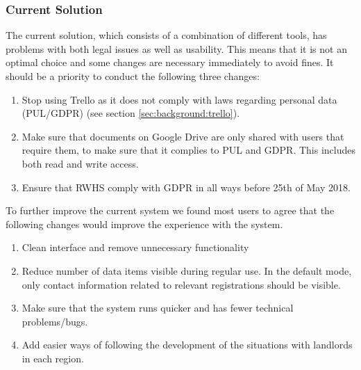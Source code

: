 \subsubsection{Current Solution}
\label{sec:result:current-solution}
The current solution, which consists of a combination of different tools, has problems with both legal issues as well as usability. This means that it is not an optimal choice and some changes are necessary immediately to avoid fines. It should be a priority to conduct the following three changes:
\begin{enumerate}
\item Stop using Trello as it does not comply with laws regarding personal data (PUL/GDPR) (see section \ref{sec:background:trello}).
\item Make sure that documents on Google Drive are only shared with users that require them, to make sure that it complies to PUL and GDPR. This includes both read and write access.
\item Ensure that RWHS comply with GDPR in all ways before 25th of May 2018.
\end{enumerate}
To further improve the current system we found most users to agree that the following changes would improve the experience with the system.
\begin{enumerate}
\item Clean interface and remove unnecessary functionality
\item Reduce number of data items visible during regular use. In the default mode, only contact information related to relevant registrations should be visible.
\item Make sure that the system runs quicker and has fewer technical problems/bugs.
\item Add easier ways of following the development of the situations with landlords in each region. 
\end{enumerate}


